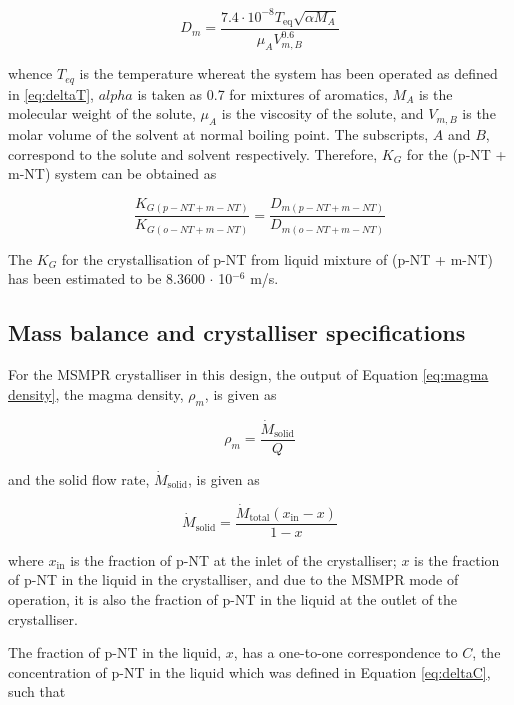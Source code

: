 \begin{equation}
    D_m = \frac{7.4 \cdot 10^{-8} T_{\mathrm{eq}} \sqrt{\alpha M_A}}{\mu_A V_{m,B}^0.6}
\end{equation}

\noindent whence $T_{eq}$ is the temperature whereat the system has been operated as defined in \ref{eq:deltaT}, $alpha$ is taken as 0.7 for mixtures of aromatics, $M_A$ is the molecular weight of the solute, $\mu_A$ is the viscosity of the solute, and $V_{m,B}$ is the molar volume of the solvent at normal boiling point. The subscripts, $A$ and $B$, correspond to the solute and solvent respectively. Therefore, $K_G$ for the (p-NT + m-NT) system can be obtained as 

\begin{equation} \label{eq:ratio of growth kinetics}
    \frac{K_{G(p-NT + m-NT)}}{K_{G(o-NT + m-NT)}} = \frac{D_{m(p-NT + m-NT)}}{D_{m(o-NT + m-NT)}}
\end{equation}

\noindent The $K_G$ for the crystallisation of p-NT from liquid mixture of (p-NT + m-NT) has been estimated to be 8.3600 $\cdot$ 10$^{-6}$ m/s. 

\subsection{Mass balance and crystalliser specifications} \label{sec: crystalliser mass balance}

For the MSMPR crystalliser in this design, the output of Equation \ref{eq:magma density}, the magma density, $\rho_m$, is given as 

\begin{equation}
    \rho_m = \frac{\dot{M}_{\mathrm{solid}}}{Q}
\end{equation}

\noindent and the solid flow rate, $\dot{M}_{\mathrm{solid}}$, is given as

\begin{equation}
    \dot{M}_{\mathrm{solid}} = \frac{\dot{M}_{\mathrm{total}} (x_{\mathrm{in}} - x)}{1 - x}
\end{equation}

\noindent where $x_{\mathrm{in}}$ is the fraction of p-NT at the inlet of the crystalliser; $x$ is the fraction of p-NT in the liquid in the crystalliser, and due to the MSMPR mode of operation, it is also the fraction of p-NT in the liquid at the outlet of the crystalliser.

The fraction of p-NT in the liquid, $x$, has a one-to-one correspondence to $C$, the concentration of p-NT in the liquid which was defined in Equation \ref{eq:deltaC}, such that 

